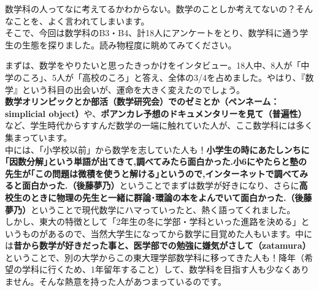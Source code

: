 数学科の人ってなに考えてるかわからない。数学のことしか考えてないの？そんなことを、よく言われてしまいます。\\
そこで、今回は数学科のB3・B4、計18人にアンケートをとり、数学科に通う学生の生態を探りました。読み物程度に眺めてみてください。

まずは、数学をやりたいと思ったきっかけをインタビュー。18人中、8人が「中学のころ」、5人が「高校のころ」と答え、全体の3/4を占めました。やはり、『数学』という科目の出会いが、運命を大きく変えたのでしょう。\\
{\bf 数学オリンピックとか部活（数学研究会）でのゼミとか（ペンネーム：simplicial object）}や、{\bf ポアンカレ予想のドキュメンタリーを見て（普遍性）}など、学生時代からすすんだ数学の一端に触れていた人が、ここ数学科には多く集まっています。\\
中には、「小学校以前」から数学を志していた人も！{\bf 小学生の時にあたしンちに｢因数分解｣という単語が出てきて,調べてみたら面白かった.小6にやたらと塾の先生が｢この問題は微積を使うと解ける｣というので,インターネットで調べてみると面白かった.（後藤夢乃）}ということでまずは数学が好きになり、さらに{\bf 高校生のときに物理の先生と一緒に群論･環論の本をよんでいて面白かった.（後藤夢乃）}ということで現代数学にハマっていったと、熱く語ってくれました。\\
しかし、東大の特徴として「2年生の冬に学部・学科といった進路を決める」というものがあるので、当然大学生になってから数学に目覚めた人もいます。中には{\bf 昔から数学が好きだった事と、医学部での勉強に嫌気がさして（zatamura）}ということで、別の大学からこの東大理学部数学科に移ってきた人も！降年（希望の学科に行くため、1年留年すること）して、数学科を目指す人も少なくありません。そんな熱意を持った人があつまっているのです。

